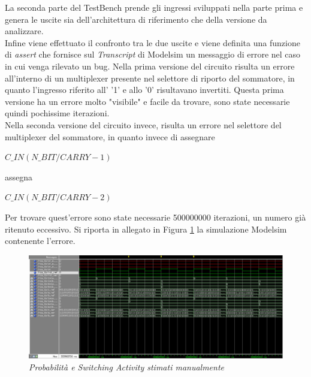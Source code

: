 La seconda parte del TestBench prende gli ingressi sviluppati nella parte prima e genera le uscite sia dell'architettura di riferimento che della versione da analizzare.\\
Infine viene effettuato il confronto tra le due uscite e viene definita una funzione di \textit{assert} che fornisce sul \textit{Transcript} di Modelsim un messaggio di errore nel caso in cui venga rilevato un bug.
Nella prima versione del circuito risulta un errore all'interno di un multiplexer presente nel selettore di riporto del sommatore, in quanto l'ingresso riferito all' '1' e allo '0' risultavano invertiti. Questa prima versione ha un errore molto "visibile" e facile da trovare, sono state necessarie quindi pochissime iterazioni.\\
Nella seconda versione del circuito invece, risulta un errore nel selettore del multiplexer del sommatore, in quanto invece di assegnare
\begin{center}
	$C\_IN(N\_BIT/CARRY-1)$
\end{center} 
assegna 
\begin{center}
	$C\_IN(N\_BIT/CARRY-2)$
\end{center}
Per trovare quest'errore sono state necessarie 500000000 iterazioni, un numero già ritenuto eccessivo. Si riporta in allegato in Figura \ref{sim1} la simulazione Modelsim contenente l'errore.
\begin{figure}[!htb]
	\centering
	\includegraphics[scale=0.6]{immagini/sim1}
	\caption{\textit{Probabilità e Switching Activity stimati manualmente}}
	\label{sim1}
\end{figure}
\\
\\
\\
\\
\\
\\
\\
\\
\\
\\
